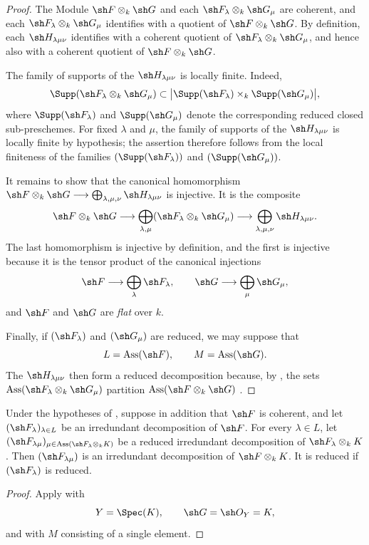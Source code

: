 \begin{proof}
The Module $\sh F\otimes_k\sh G$ and each
$\sh F_\lambda\otimes_k\sh G_\mu$ are coherent, and each
$\sh F_\lambda\otimes_k\sh G_\mu$ identifies with a quotient of
$\sh F\otimes_k\sh G$.
By definition, each $\sh H_{\lambda\mu\nu}$ identifies with a coherent
quotient of $\sh F_\lambda\otimes_k\sh G_\mu$, and hence also with a
coherent quotient of $\sh F\otimes_k\sh G$.

The family of supports of the $\sh H_{\lambda\mu\nu}$ is locally finite.
Indeed,
\[
\Supp(\sh F_\lambda\otimes_k\sh G_\mu)
\subset
\bigl|\Supp(\sh F_\lambda)\times_k\Supp(\sh G_\mu)\bigr|,
\]
where $\Supp(\sh F_\lambda)$ and $\Supp(\sh G_\mu)$ denote the
corresponding reduced closed sub-preschemes.
For fixed $\lambda$ and $\mu$, the family of supports of the
$\sh H_{\lambda\mu\nu}$ is locally finite by hypothesis; the assertion
therefore follows from the local finiteness of the families
$(\Supp(\sh F_\lambda))$ and $(\Supp(\sh G_\mu))$.

It remains to show that the canonical homomorphism $\sh F\otimes_k\sh G
\longrightarrow
\bigoplus_{\lambda,\mu,\nu}\sh H_{\lambda\mu\nu}$
is injective.
It is the composite
\[
\sh F\otimes_k\sh G
\longrightarrow
\bigoplus_{\lambda,\mu}
(\sh F_\lambda\otimes_k\sh G_\mu)
\longrightarrow
\bigoplus_{\lambda,\mu,\nu}\sh H_{\lambda\mu\nu}.
\]
The last homomorphism is injective by definition, and the first is
injective because it is the tensor product of the canonical injections
\[
\sh F\longrightarrow\bigoplus_\lambda\sh F_\lambda,
\qquad
\sh G\longrightarrow\bigoplus_\mu\sh G_\mu,
\]
and $\sh F$ and $\sh G$ are \emph{flat} over $k$.

Finally, if $(\sh F_\lambda)$ and $(\sh G_\mu)$ are reduced, we may
suppose that
\[
L=\operatorname{Ass}(\sh F),
\qquad
M=\operatorname{Ass}(\sh G).
\]
The $\sh H_{\lambda\mu\nu}$ then form a reduced decomposition because,
by , the sets $\operatorname{Ass}(\sh F_\lambda\otimes_k\sh G_\mu)$
partition
$\operatorname{Ass}(\sh F\otimes_k\sh G)$
.
\end{proof}

\begin{corollary}[4.2.10]
\label{IV.4.2.10}
Under the hypotheses of , suppose in addition that
$\sh F$ is coherent, and let
$(\sh F_\lambda)_{\lambda\in L}$ be an irredundant decomposition of
$\sh F$.
For every $\lambda\in L$, let $(\sh F_{\lambda\mu})_{
\mu\in\operatorname{Ass}(\sh F_\lambda\otimes_k K)}$
be a reduced irredundant decomposition of
$\sh F_\lambda\otimes_k K$.
Then $(\sh F_{\lambda\mu})$ is an irredundant decomposition of
$\sh F\otimes_k K$.
It is reduced if $(\sh F_\lambda)$ is reduced.
\end{corollary}

\begin{proof}
Apply  with
\[
Y=\Spec(K),
\qquad
\sh G=\sh O_Y=K,
\]
and with $M$ consisting of a single element.
\end{proof}
